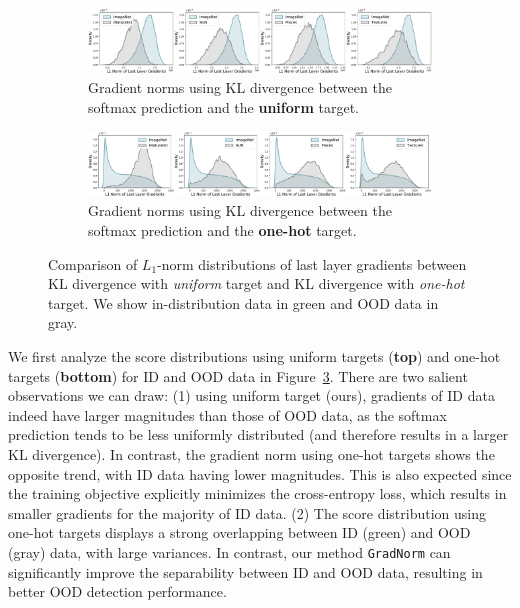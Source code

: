 \documentclass{article}
\begin{document}
\begin{figure}[t]
    \centering
        \begin{subfigure}[b]{1.0\textwidth}
        \centering
        \includegraphics[width=1.0\textwidth]{figures/our_ce_distribution_final.pdf}
        \caption{Gradient norms using KL divergence between the softmax prediction and the \textbf{uniform} target.}
        \label{subfig:score_dist_uniform}
        \end{subfigure}
        \begin{subfigure}[b]{1.0\textwidth}
        \centering
        \includegraphics[width=1.0\textwidth]{figures/original_ce_distribution_final.pdf}
        \caption{Gradient norms using KL divergence between the softmax prediction and the \textbf{one-hot} target.}
        \label{subfig:score_dist_onehot}
        \end{subfigure}
    \caption{\small{Comparison of $L_1$-norm distributions of last layer gradients between KL divergence with \emph{uniform} target and KL divergence with \emph{one-hot} target. We show in-distribution data in green and OOD data in gray. }}
    \label{fig:score_dist}
    \vspace{-0.4cm}
\end{figure}

We first analyze the score distributions using uniform targets (\textbf{top}) and one-hot targets (\textbf{bottom}) for ID and OOD data in Figure~\ref{fig:score_dist}. 
There are two salient observations we can draw: (1) using uniform target (ours), gradients of ID data indeed have larger magnitudes than those of OOD data, as the softmax prediction tends to be less uniformly distributed (and therefore results in a larger KL divergence). In contrast, the gradient norm using one-hot targets shows the opposite trend, with ID data having lower magnitudes. This is also expected since the training objective explicitly minimizes the cross-entropy loss, which results in smaller gradients for the majority of ID data. (2) The score distribution using one-hot targets displays a strong overlapping between ID (green) and OOD (gray) data, with large variances. In contrast, our method \texttt{GradNorm} can significantly improve the separability between ID and OOD data, resulting in better OOD detection performance.
\end{document}
